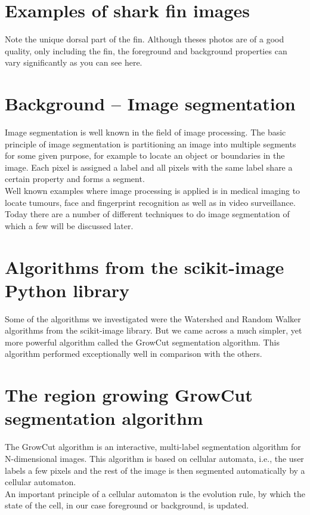 \documentclass[a4paper,10pt]{article}
\begin{document}
\section{Examples of shark fin images}
Note the unique dorsal part of the fin.  Although theses photos are of a good
quality, only including the fin, the foreground and background properties can
vary significantly as you can see here.


\section{Background -- Image segmentation}
Image segmentation is well known in the field of image processing.  The basic
principle of image segmentation is partitioning an image into multiple segments
for some given purpose, for example to locate an object or boundaries in the
image.  Each pixel is assigned a label and all pixels with
the same label share a certain property and forms a segment.  \\

Well known
examples where image processing is applied is in medical imaging to locate
tumours, face and fingerprint recognition as well as in video surveillance.
Today there are a number of different techniques to do image
segmentation of which a few will be discussed later.


\section{Algorithms from the scikit-image Python library}
Some of the algorithms we investigated were the Watershed and Random Walker
algorithms from the scikit-image library.  But we came across a much simpler,
yet more powerful algorithm called the GrowCut segmentation algorithm.  This
algorithm performed exceptionally well in comparison with the others. 

\section{The region growing GrowCut segmentation algorithm}
The GrowCut algorithm is an interactive, multi-label segmentation
algorithm for N-dimensional images.  This algorithm is based on cellular
automata, i.e.,  the user labels a few pixels and the rest of the image is then
segmented automatically by a cellular automaton. \\

An important principle of a cellular automaton
is the evolution rule, by which the state of the cell, in our case foreground or
background, is updated.  \\
\end{document}
